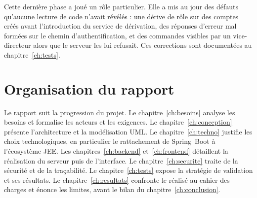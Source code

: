 Cette dernière phase a joué un rôle particulier. Elle a mis au jour des défauts qu'aucune
lecture de code n'avait révélés : une dérive de rôle sur des comptes créés avant
l'introduction du service de dérivation, des réponses d'erreur mal formées sur le chemin
d'authentification, et des commandes visibles par un vice-directeur alors que le serveur
les lui refusait. Ces corrections sont documentées au chapitre~\ref{ch:tests}.

\section{Organisation du rapport}

Le rapport suit la progression du projet. Le chapitre~\ref{ch:besoins} analyse les besoins
et formalise les acteurs et les exigences. Le chapitre~\ref{ch:conception} présente
l'architecture et la modélisation UML. Le chapitre~\ref{ch:techno} justifie les choix
technologiques, en particulier le rattachement de Spring~Boot à l'écosystème JEE. Les
chapitres~\ref{ch:backend} et~\ref{ch:frontend} détaillent la réalisation du serveur puis
de l'interface. Le chapitre~\ref{ch:securite} traite de la sécurité et de la traçabilité.
Le chapitre~\ref{ch:tests} expose la stratégie de validation et ses résultats. Le
chapitre~\ref{ch:resultats} confronte le réalisé au cahier des charges et énonce les
limites, avant le bilan du chapitre~\ref{ch:conclusion}.
